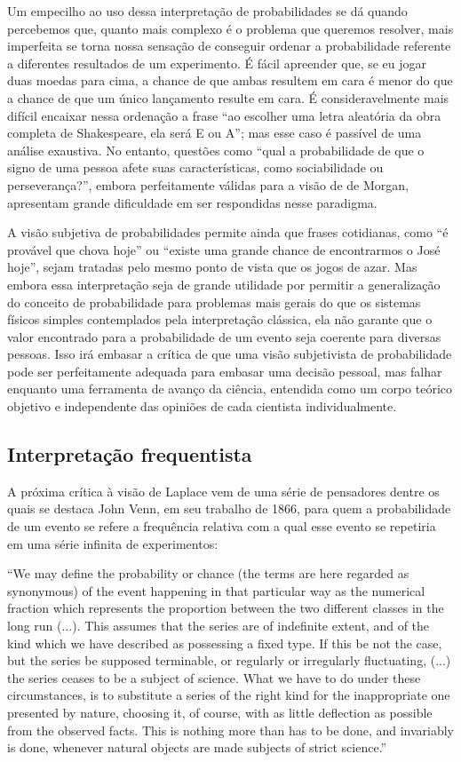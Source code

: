 Um empecilho ao uso dessa interpretação de probabilidades se dá quando percebemos que, quanto mais complexo é o 
problema que queremos resolver, mais imperfeita se torna nossa sensação de conseguir ordenar a probabilidade referente
a diferentes resultados de um experimento. É fácil apreender que, se eu jogar duas moedas para cima, a chance de que ambas 
resultem em cara é menor do que a chance de que um único lançamento resulte em cara. É consideravelmente mais difícil encaixar
nessa ordenação a frase ``ao escolher uma letra aleatória da obra completa de Shakespeare, ela será E ou A''; mas esse caso
é passível de uma análise exaustiva. No entanto, questões como ``qual a probabilidade de que o signo de uma pessoa afete
suas características, como sociabilidade ou perseverança?'', embora perfeitamente válidas para a visão de de Morgan, apresentam
grande dificuldade em ser respondidas nesse paradigma.

A visão subjetiva de probabilidades permite ainda que frases cotidianas, como ``é provável que chova hoje'' ou ``existe uma grande
chance de encontrarmos o José hoje'', sejam tratadas pelo mesmo ponto de vista que os jogos de azar. Mas
embora essa interpretação seja de grande utilidade por permitir a generalização do conceito de probabilidade para problemas
mais gerais do que os sistemas físicos simples contemplados pela interpretação clássica, ela não garante que o valor encontrado
para a probabilidade de um evento seja coerente para diversas pessoas. Isso irá embasar a crítica de que uma visão subjetivista 
de probabilidade pode ser perfeitamente adequada para embasar uma decisão pessoal, mas falhar enquanto uma ferramenta de 
avanço da ciência, entendida como um corpo teórico objetivo e independente das opiniões de cada cientista individualmente.

\subsection{Interpretação frequentista}
A próxima crítica à visão de Laplace vem de uma série de pensadores dentre os quais se destaca John Venn, em seu trabalho de 
1866, para quem a probabilidade de um evento se refere a frequência relativa com a qual esse evento se repetiria em uma
série infinita de experimentos:

``We may define the probability or chance (the terms are here regarded as synonymous) of the event happening in that
particular way as the numerical fraction which represents the proportion between the two different classes in the long run (...).
This assumes that the series are of indefinite extent, and of the kind which we have described as possessing a fixed type.
If this be not the case, but the series be supposed terminable, or regularly or irregularly fluctuating, (...) the series ceases
to be a subject of science. What we have to do under these circumstances, is to substitute a series of the right kind for
the inappropriate one presented by nature, choosing it, of course, with as little deflection as possible from the observed facts.
This is nothing more than has to be done, and invariably is done, whenever natural objects are made subjects of strict science.''
\cite{Venn1866}

